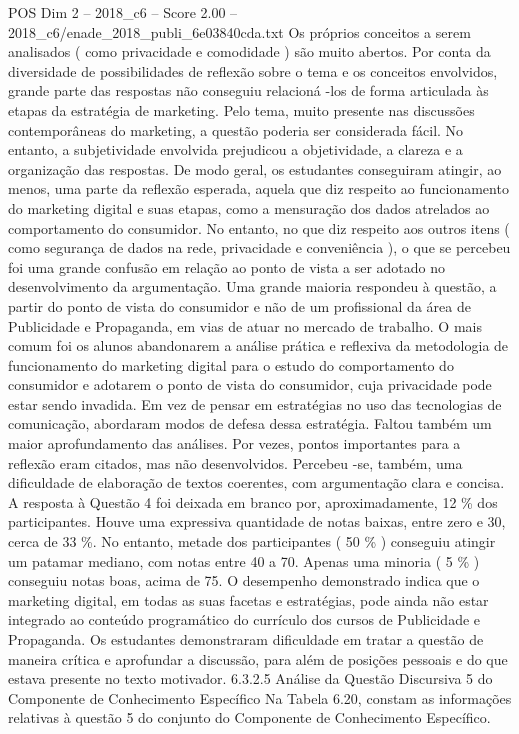 \begin{textsample}{POS Dim 2 – 2018\_c6 – Score 2.00 – 2018\_c6/enade\_2018\_publi\_6e03840cda.txt}
Os próprios conceitos a serem analisados ( como privacidade e comodidade ) são muito abertos.
Por conta da diversidade de possibilidades de reflexão sobre o tema e os conceitos envolvidos, grande parte das respostas não conseguiu relacioná -los de forma articulada às etapas da estratégia de marketing.
Pelo tema, muito presente nas discussões contemporâneas do marketing, a questão poderia ser considerada fácil.
No entanto, a subjetividade envolvida prejudicou a objetividade, a clareza e a organização das respostas.
De modo geral, os estudantes conseguiram atingir, ao menos, uma parte da reflexão esperada, aquela que diz respeito ao funcionamento do marketing digital e suas etapas, como a mensuração dos dados atrelados ao comportamento do consumidor.
No entanto, no que diz respeito aos outros itens ( como segurança de dados na rede, privacidade e conveniência ), o que se percebeu foi uma grande confusão em relação ao ponto de vista a ser adotado no desenvolvimento da argumentação.
Uma grande maioria respondeu à questão, a partir do ponto de vista do consumidor e não de um profissional da área de Publicidade e Propaganda, em vias de atuar no mercado de trabalho.
O mais comum foi os alunos abandonarem a análise prática e reflexiva da metodologia de funcionamento do marketing digital para o estudo do comportamento do consumidor e adotarem o ponto de vista do consumidor, cuja privacidade pode estar sendo invadida.
Em vez de pensar em estratégias no uso das tecnologias de comunicação, abordaram modos de defesa dessa estratégia.
Faltou também um maior aprofundamento das análises.
Por vezes, pontos importantes para a reflexão eram citados, mas não desenvolvidos.
Percebeu -se, também, uma dificuldade de elaboração de textos coerentes, com argumentação clara e concisa.
A resposta à Questão 4 foi deixada em branco por, aproximadamente, 12 \% dos participantes.
Houve uma expressiva quantidade de notas baixas, entre zero e 30, cerca de 33 \%.
No entanto, metade dos participantes ( 50 \% ) conseguiu atingir um patamar mediano, com notas entre 40 a 70.
Apenas uma minoria ( 5 \% ) conseguiu notas boas, acima de 75.
O desempenho demonstrado indica que o marketing digital, em todas as suas facetas e estratégias, pode ainda não estar integrado ao conteúdo programático do currículo dos cursos de Publicidade e Propaganda.
Os estudantes demonstraram dificuldade em tratar a questão de maneira crítica e aprofundar a discussão, para além de posições pessoais e do que estava presente no texto motivador. 6.3.2.5 Análise da Questão Discursiva 5 do Componente de Conhecimento Específico Na Tabela 6.20, constam as informações relativas à questão 5 do conjunto do Componente de Conhecimento Específico.

\end{textsample}
